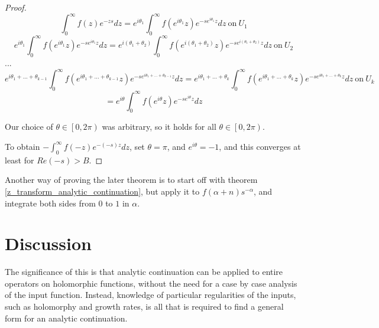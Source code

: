 \documentclass{article}
\begin{document}
\begin{proof}
		$$ \int_{0}^{\infty} f(z) e^{-zs} dz = e^{i \theta_1} \int_{0}^{\infty} f(e^{i \theta_1} z) e^{-s e^{i \theta_1} z} dz \ \text{on} \ U_1 $$
		$$ e^{i \theta_1} \int_{0}^{\infty} f(e^{i \theta_1} z) e^{-s e^{i \theta_1} z} dz = e^{i \left( \theta_1 + \theta_2 \right)} \int_{0}^{\infty} f( e^{i \left( \theta_1 + \theta_2 \right)} z) e^{ -s e^{i \left( \theta_1 + \theta_2 \right)} z} dz \ \text{on} \ U_2 $$
		...
		$$ e^{i \theta_1 + ... + \theta_{k-1} } \int_{0}^{\infty} f( e^{i \theta_1 + ... + \theta_{k-1} } z) e^{-s e^{i \theta_1 + ... + \theta_{k-1} } z} dz = e^{i \theta_1 + ... + \theta_{k} } \int_{0}^{\infty} f( e^{i \theta_1 + ... + \theta_{k} } z) e^{ -s e^{i \theta_1 + ... + \theta_{k} } z} dz \ \text{on} \ U_k $$
		$$ = e^{i \theta} \int_{0}^{\infty} f(e^{i \theta } z) e^{-s e^{i \theta} z} dz $$
		
		
		
		Our choice of $\theta \in \left[ 0, 2 \pi \right)$ was arbitrary, so it holds for all $\theta \in \left[ 0 , 2 \pi \right)$. 
		
		
		
		To obtain $ -\int_{0}^{\infty} f(-z) e^{-(-s)z} dz$, set $\theta = \pi$, and $e^{i \theta} = -1$, and this converges at least for $Re(-s) > B$. 
		
	\end{proof}

	Another way of proving the later theorem is to start off with theorem \ref{z_transform_analytic_continuation}, but apply it to $f(\alpha + n) s^{-\alpha}$, and integrate both sides from $0$ to $1$ in $\alpha$. 

	
	
	\section{ Discussion }
	
	The significance of this is that analytic continuation can be applied to entire operators on holomorphic functions, without the need for a case by case analysis of the input function. Instead, knowledge of particular regularities of the inputs, such as holomorphy and growth rates, is all that is required to find a general form for an analytic continuation. 
	
	
	
	
	
\end{document}
